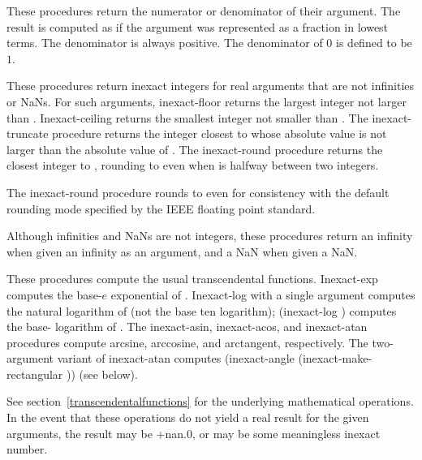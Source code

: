 \begin{entry}{%
}

These procedures return the numerator or denominator of their
argument.  The result is computed as if the argument was represented
as a fraction in lowest terms.  The denominator is always positive.
The denominator of $0$ is defined to be $1$.
\end{entry}

\begin{entry}{%
}

These procedures return inexact integers for real arguments that are
not infinities or NaNs.  For such arguments, {\cf inexact-floor}
returns the largest integer not larger than .  {\cf
  Inexact-ceiling} returns the smallest integer not smaller than
.  The {\cf inexact-truncate} procedure returns the integer closest to
 whose absolute value is not larger than the absolute value of
.  The {\cf inexact-round} procedure returns the closest integer to
, rounding to even when  is halfway between two
integers.

\begin{rationale}
The {\cf inexact-round} procedure rounds to even for consistency with the default rounding
mode specified by the IEEE floating point standard.
\end{rationale}

Although infinities and NaNs are not integers, these procedures return
an infinity when given an infinity as an argument, and a NaN when
given a NaN.
\end{entry}

\begin{entry}{%
}

These procedures compute the usual transcendental functions.  {\cf
  Inexact-exp} computes the base-$e$ exponential of .  {\cf
  Inexact-log} with a single argument computes the natural logarithm
of  (not the base ten logarithm); {\cf (inexact-log 
  )} computes the base- logarithm of .
The {\cf inexact-asin}, {\cf inexact-acos}, and {\cf inexact-atan} procedures compute
arcsine, arccosine, and arctangent, respectively.  The two-argument
variant of {\cf inexact-atan} computes {\cf (inexact-angle
  (inexact-make-rectangular  ))} (see below).

See section~\ref{transcendentalfunctions} for the underlying
mathematical operations.  In the event that these operations do not
yield a real result for the given arguments, the result may be {\cf
  +nan.0}, or may be some meaningless inexact number.
\end{entry}

